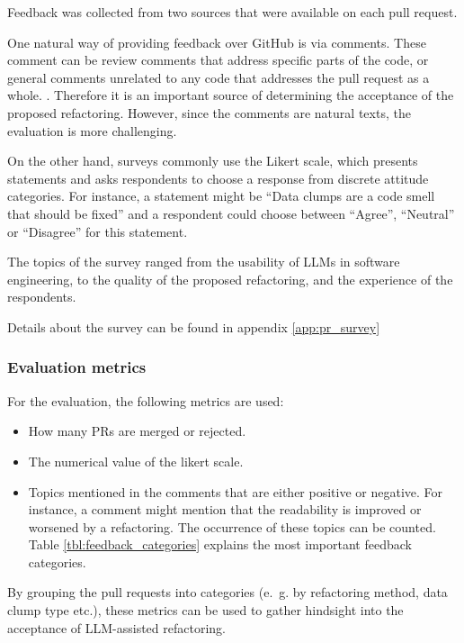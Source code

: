 Feedback was collected from two sources that were available on each pull request. 

One  natural way of providing feedback over GitHub is via comments. These comment can be review comments that address specific parts of the code, or general comments unrelated to any code that addresses the pull request as a whole. \cite{10.1145/3597208}. Therefore it is an important source of determining the acceptance of the proposed refactoring. However, since the comments are natural texts, the evaluation is more challenging.


On the other hand, surveys commonly use the Likert scale, which presents statements and asks respondents to choose a response from discrete attitude categories. \cite{edmondson2005likert}
For instance, a statement might be \enquote{Data clumps are a code smell that should be fixed} and a respondent could choose between \enquote{Agree}, \enquote{Neutral} or \enquote{Disagree} for this statement. 


The topics of the survey  ranged from the usability of \acp{LLM} in software engineering, to the quality of the proposed refactoring, and the experience of the respondents. 


Details about the survey can be found in appendix \ref{app:pr_survey}


\subsubsection{Evaluation metrics}

For the evaluation, the following metrics are used:
\begin{itemize}

    \item  How many PRs are merged or rejected.
    \item The numerical value of the likert scale.
    \item Topics mentioned in the comments that are either positive or negative. For instance, a comment might mention that the readability is improved or worsened by a refactoring. The occurrence of these topics can be counted.   Table \ref{tbl:feedback_categories} explains the most important feedback categories. 

\end{itemize}

By grouping the pull requests into categories (e.~g. by refactoring method, data clump type etc.), these metrics can be used to gather hindsight into the acceptance of \ac{LLM}-assisted refactoring. 

